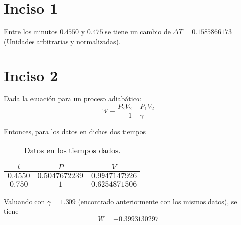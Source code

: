 
\section{Inciso 1}

Entre los minutos $0.4550$ y $0.475$ se tiene un cambio de $\Delta T = 0.1585866173$ (Unidades arbitrarias y normalizadas).


\section{Inciso 2}

Dada la ecuación para un proceso adiabático:
	\begin{equation*}
		W = \frac{P_2 V_2 - P_1 V_2}{1 - \gamma}
	\end{equation*}
	
Entonces, para los datos en dichos dos tiempos
	\begin{table}[H]
		\centering
		\caption{Datos en los tiempos dados.}
		\begin{tabular}{||c||c|c||}
			\hline
			\hline
				$t$ & $P$ & $V$ \\
			\hline
			\hline
				$0.4550$ & $0.5047672239$ & $0.9947147926$ \\
			\hline
				$0.750$ & $1$ & $0.6254871506$ \\
			\hline
			\hline
		\end{tabular}
	\end{table}


Valuando con $\gamma = 1.309$ (encontrado anteriormente con los mismos datos), se tiene 
	\begin{equation*}
		\boxed{W = -0.3993130297}
	\end{equation*}


























